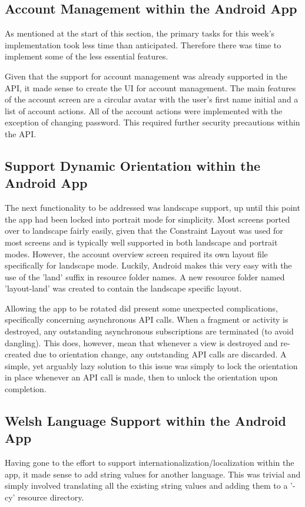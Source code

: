 \subsection{Account Management within the Android App}
As mentioned at the start of this section, the primary tasks for this week's implementation took less time than anticipated. Therefore there was time to implement some of the less essential features. 

Given that the support for account management was already supported in the API, it made sense to create the UI for account management. The main features of the account screen are a circular avatar with the user's first name initial and a list of account actions. All of the account actions were implemented with the exception of changing password. This required further security precautions within the API.

\subsection{Support Dynamic Orientation within the Android App}
The next functionality to be addressed was landscape support, up until this point the app had been locked into portrait mode for simplicity. Most screens ported over to landscape fairly easily, given that the Constraint Layout was used for most screens and is typically well supported in both landscape and portrait modes. However, the account overview screen required its own layout file specifically for landscape mode. Luckily, Android makes this very easy with the use of the 'land' suffix in resource folder names. A new resource folder named 'layout-land' was created to contain the landscape specific layout. 

Allowing the app to be rotated did present some unexpected complications,  specifically concerning asynchronous API calls. When a fragment or activity is destroyed, any outstanding asynchronous subscriptions are terminated (to avoid dangling). This does, however, mean that whenever a view is destroyed and re-created due to orientation change, any outstanding API calls are discarded. A simple, yet arguably lazy solution to this issue was simply to lock the orientation in place whenever an API call is made, then to unlock the orientation upon completion.

\subsection{Welsh Language Support within the Android App}
Having gone to the effort to support internationalization/localization within the app, it made sense to add string values for another language. This was trivial and simply involved translating all the existing string values and adding them to a '-cy' resource directory.

